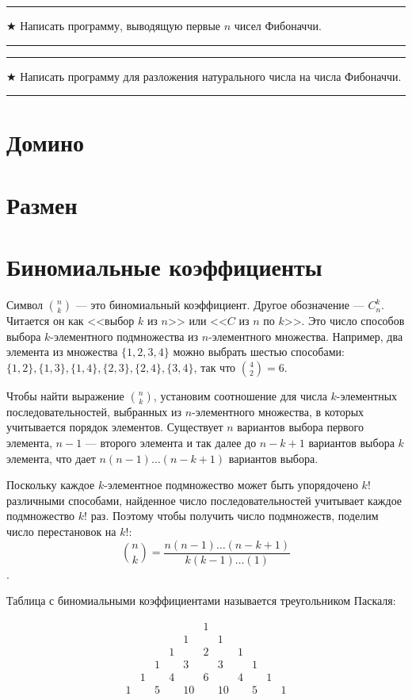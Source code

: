 \documentclass[14pt]{book}
\newenvironment{task}
 { \vspace{2ex}\hrule\vspace{2ex}$\bigstar$ }
 { \vspace{2ex}\hrule\vspace{2ex} }
\begin{document}
\begin{task}
Написать программу, выводящую первые $n$ чисел Фибоначчи.
\end{task}

\begin{task}
Написать программу для разложения натурального числа на числа Фибоначчи.
\end{task}

\section{Домино}
\section{Размен}
\section{Биномиальные коэффициенты}

Символ $\binom{n}{k}$ --- это биномиальный коэффициент. Другое обозначение --- $C_n^k$.
Читается он как <<выбор $k$ из $n$>> или <<$C$ из $n$ по $k$>>. Это число способов выбора
$k$-элементного подмножества из $n$-элементного множества. Например, два элемента
из множества $\{1,2,3,4\}$ можно выбрать шестью способами: 
$\{1,2\}, \{1,3\}, \{1,4\}, \{2,3\}, \{2,4\}, \{3,4\}$, так что $\binom{4}{2}=6$.

Чтобы найти выражение $\binom{n}{k}$, установим соотношение для числа $k$-элементных
последовательностей, выбранных из $n$-элементного множества, в которых учитывается порядок
элементов. Существует $n$ вариантов выбора первого элемента, $n-1$ --- второго элемента
и так далее до $n-k+1$ вариантов выбора $k$ элемента, что дает $n(n-1)\ldots(n-k+1)$
вариантов выбора.

Поскольку каждое $k$-элементное подмножество может быть упорядочено $k!$ различными способами,
найденное число последовательностей учитывает каждое подмножество $k!$ раз. Поэтому чтобы
получить число подмножеств, поделим число перестановок на $k!$:
$$\binom{n}{k} = \frac{n(n-1)\ldots(n-k+1)}{k(k-1)\ldots(1)}$$.

Таблица с биномиальными коэффициентами называется треугольником Паскаля:

$$
 \begin{array}{ccccccccccc}
 &&&&& 1 \\
 &&&& 1 && 1 \\
 &&& 1 && 2 && 1 \\
 && 1 && 3 && 3 && 1 \\
 & 1 && 4 && 6 && 4 && 1 \\
 1 && 5 && 10 && 10 && 5 && 1
 \end{array}
$$
\end{document}

